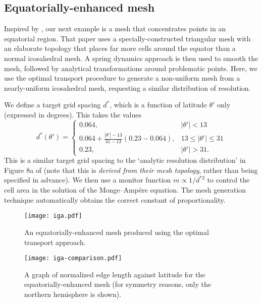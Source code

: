 \documentclass[11pt, a4paper]{scrartcl}  %
\theoremstyle{plain}
\theoremstyle{definition}
\numberwithin{equation}{section}
\begin{document}
\subsection{Equatorially-enhanced mesh}

Inspired by \citet{iga2017equatorially}, our next example is a mesh that
concentrates points in an equatorial region. That paper uses a
specially-constructed triangular mesh with an elaborate topology that
places far more cells around the equator than a normal icosahedral mesh.
A spring dynamics approach is then used to smooth the mesh, followed by
analytical transformations around problematic points. Here, we use the
optimal transport procedure to generate a non-uniform mesh from a
nearly-uniform icosahedral mesh, requesting a similar distribution of
resolution.

We define a target grid spacing $d^*$, which is a function of latitude 
$\theta'$ only (expressed in degrees). This takes the values
\begin{equation}
d^*(\theta') =
\begin{cases}
0.064, &|\theta'| < 13\\
0.064 + \frac{|\theta'| - 13}{31 - 13} (0.23 - 0.064), &13 \leq |\theta'| \leq 31\\
0.23, &|\theta'| > 31.
\end{cases}
\end{equation}
This is a similar target grid spacing to the `analytic resolution
distribution' in Figure 8a of \citet{iga2017equatorially} (note that
this is \emph{derived from their mesh topology}, rather than being
specified in advance). We then use a monitor function $m \propto 1/d^{*2}$
to control the cell area in the solution of the Monge--Ampère equation.
The mesh generation technique automatically obtains the correct constant
of proportionality.

\begin{figure}[!tb]
  \centering
  \texttt{[image: iga.pdf]}
  \caption{An equatorially-enhanced mesh produced using the optimal
transport approach.}
\label{fig:iga-mesh}
\end{figure}

\begin{figure}[!tb]
  \centering
  \texttt{[image: iga-comparison.pdf]}
  \caption{A graph of normalized edge length against latitude for the
equatorially-enhanced mesh (for symmetry reasons, only the northern
hemisphere is shown).}
\label{fig:iga-comp}
\end{figure}
\end{document}
